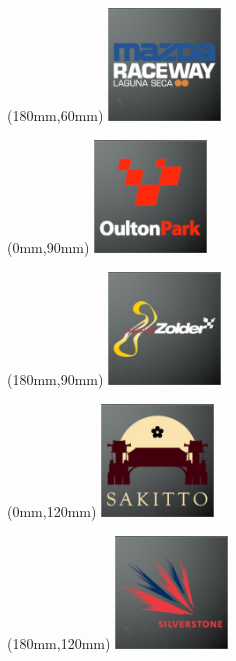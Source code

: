 \begin{textblock*}{30mm}(180mm,60mm)%
\includegraphics[width=30mm]{LG/2015-05-20_00085.png}
\end{textblock*}
\begin{textblock*}{30mm}(0mm,90mm)%
\includegraphics[width=30mm]{LG/2015-05-20_00091.png}
\end{textblock*}
\begin{textblock*}{30mm}(180mm,90mm)%
\includegraphics[width=30mm]{LG/2015-05-20_00100.png}
\end{textblock*}
\begin{textblock*}{30mm}(0mm,120mm)%
\includegraphics[width=30mm]{LG/2015-05-20_00093.png}
\end{textblock*}
\begin{textblock*}{30mm}(180mm,120mm)%
\includegraphics[width=30mm]{LG/2015-05-20_00094.png}
\end{textblock*}

